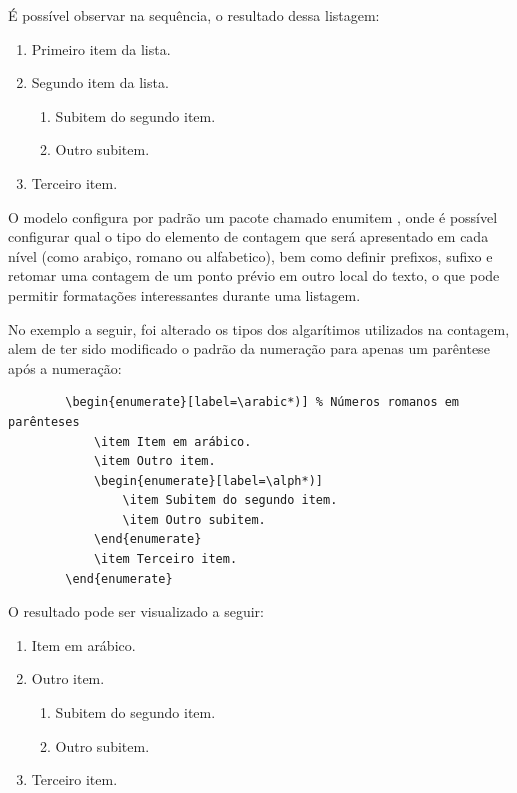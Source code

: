 \begin{enumerate}
	É possível observar na sequência, o resultado dessa listagem:

	\begin{enumerate}
		\item Primeiro item da lista.
		\item Segundo item da lista.
		\begin{enumerate}
			\item Subitem do segundo item.
			\item Outro subitem.
		\end{enumerate}
		\item Terceiro item.
	\end{enumerate}

	O modelo configura por padrão um pacote chamado enumitem \cite{enumitem_package}, onde é possível configurar qual o tipo do elemento de contagem que será apresentado em cada nível (como arabiço, romano ou alfabetico), bem como definir prefixos, sufixo e retomar uma contagem de um ponto prévio em outro local do texto, o que pode permitir formatações interessantes durante uma listagem.

	No exemplo a seguir, foi alterado os tipos dos algarítimos utilizados na contagem, alem de ter sido modificado o padrão da numeração para apenas um parêntese após a numeração:

	\begin{verbatim}
		\begin{enumerate}[label=\arabic*)] % Números romanos em parênteses
			\item Item em arábico.
			\item Outro item.
			\begin{enumerate}[label=\alph*)]
				\item Subitem do segundo item.
				\item Outro subitem.
			\end{enumerate}
			\item Terceiro item.
		\end{enumerate}
	\end{verbatim}

	O resultado pode ser visualizado a seguir:

	\begin{enumerate}[label=\arabic*)] %
		\item Item em arábico.
		\item Outro item.
		\begin{enumerate}[label=\alph*)]
			\item Subitem do segundo item.
			\item Outro subitem.
		\end{enumerate}
		\item Terceiro item.
	\end{enumerate}


\end{enumerate}
